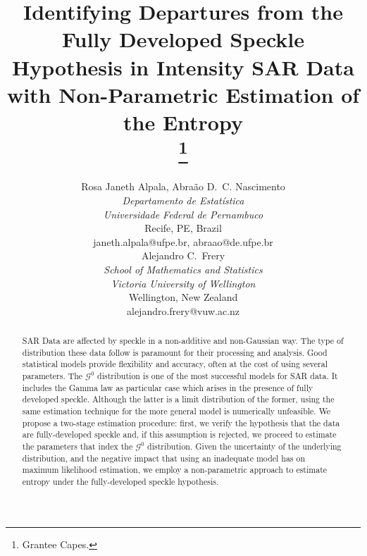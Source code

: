 \documentclass[conference]{IEEEtran}
\begin{document}
\title{Identifying Departures from the Fully Developed Speckle Hypothesis in Intensity SAR Data with Non-Parametric Estimation of the Entropy\\

\thanks{Grantee Capes.}
}

\author{
\begin{minipage}[t]{0.5\textwidth}
\centering
Rosa Janeth Alpala, Abraão D.\ C. Nascimento \\
\textit{Departamento de Estatística} \\
\textit{Universidade Federal de Pernambuco}\\
Recife, PE, Brazil\\
janeth.alpala@ufpe.br, abraao@de.ufpe.br 
\end{minipage}%
\begin{minipage}[t]{0.4\textwidth}
\centering
Alejandro C.\ Frery\\
\textit{School of Mathematics and Statistics} \\
\textit{Victoria University of Wellington}\\
Wellington, New Zealand\\
alejandro.frery@vuw.ac.nz
\end{minipage}
}

\maketitle\begin{abstract}
SAR Data are affected by speckle in a non-additive and non-Gaussian way.
The type of distribution these data follow is paramount for their processing and analysis.
Good statistical models provide flexibility and accuracy, often at the cost of using several parameters.
The $\mathcal{G}^0$ distribution is one of the most successful models for SAR data. 
It includes the Gamma law as particular case which arises in the presence of fully developed speckle.
Although the latter is a limit distribution of the former, using the same estimation technique for the more general model is numerically unfeasible.
We propose a two-stage estimation procedure: first, we verify the hypothesis that the data are fully-developed speckle and, if this assumption is rejected, we proceed to estimate the parameters that index the $\mathcal G^0$ distribution.
Given the uncertainty of the underlying distribution, and the negative impact that using an inadequate model has on maximum likelihood estimation, we employ a non-parametric approach to estimate entropy under the fully-developed speckle hypothesis.
\end{abstract}
\end{document}
